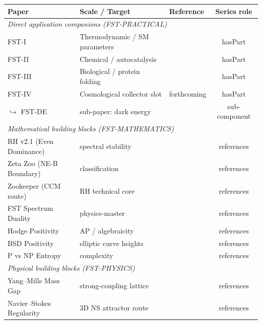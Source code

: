 \documentclass[11pt,a4paper]{article}
\theoremstyle{remark}
\begin{document}
\begin{table}[h]
\centering
\renewcommand{\arraystretch}{1.18}
\small
\begin{tabular}{lllc}
\toprule
\textbf{Paper} & \textbf{Scale / Target} & \textbf{Reference} &
\textbf{Series role} \\
\midrule
\multicolumn{4}{l}{\textit{Direct application companions (FST-PRACTICAL)}} \\
FST-I   & Thermodynamic / SM parameters     & \cite{GeigerFST-I-2026}     & hasPart \\
FST-II  & Chemical / autocatalysis          & \cite{GeigerFST-II-2026}    & hasPart \\
FST-III & Biological / protein folding      & \cite{GeigerFST-III-2026}   & hasPart \\
FST-IV  & Cosmological collector slot       & forthcoming                 & hasPart \\
\quad $\hookrightarrow$ FST-DE & sub-paper: dark energy & \cite{GeigerFST-DE-2026} & sub-component \\
\midrule
\multicolumn{4}{l}{\textit{Mathematical building blocks (FST-MATHEMATICS)}} \\
RH v2.1 (Even Dominance)        & spectral stability      & \cite{GeigerRH-EvenDom-2026} & references \\
Zeta Zoo (NE-B Boundary)        & classification          & \cite{GeigerZetaZoo-2026}    & references \\
Zookeeper (CCM route)           & RH technical core       & \cite{GeigerZookeeper-2026}  & references \\
FST Spectrum Duality            & physics-master          & \cite{GeigerSpectrumDuality-2026} & references \\
Hodge Positivity                & AP / algebraicity       & \cite{GeigerHodge-2026}      & references \\
BSD Positivity                  & elliptic curve heights  & \cite{GeigerBSD-2026}        & references \\
P vs NP Entropy                 & complexity              & \cite{GeigerPvsNP-2026}      & references \\
\midrule
\multicolumn{4}{l}{\textit{Physical building blocks (FST-PHYSICS)}} \\
Yang--Mills Mass Gap            & strong-coupling lattice & \cite{GeigerYM-2026}         & references \\
Navier--Stokes Regularity       & 3D NS attractor route   & \cite{GeigerNS-2026}         & references \\

\end{tabular}
\end{table}
\end{document}
